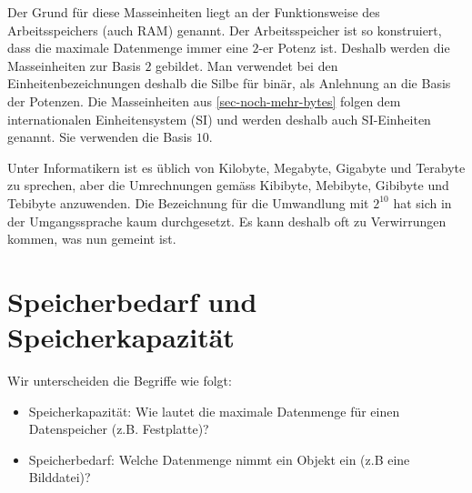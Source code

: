 Der Grund für diese Masseinheiten liegt an der Funktionsweise des Arbeitsspeichers (auch \ac{RAM}) genannt. Der Arbeitsspeicher ist so konstruiert, dass die maximale Datenmenge immer eine $2$-er Potenz ist. Deshalb werden die Masseinheiten zur Basis $2$ gebildet. Man verwendet bei den Einheitenbezeichnungen deshalb die Silbe  für binär, als Anlehnung an die Basis der Potenzen. Die Masseinheiten aus \autoref{sec-noch-mehr-bytes} folgen dem internationalen Einheitensystem (\ac{SI}) und werden deshalb auch \ac{SI}-Einheiten genannt. Sie verwenden die Basis $10$.

\begin{important}
Unter Informatikern ist es üblich von Kilobyte, Megabyte, Gigabyte und Terabyte zu sprechen, aber die Umrechnungen gemäss Kibibyte, Mebibyte, Gibibyte und Tebibyte anzuwenden. Die  Bezeichnung für die Umwandlung mit $2^{10}$ hat sich in der Umgangssprache kaum durchgesetzt. Es kann deshalb oft zu Verwirrungen kommen, was nun gemeint ist.
\end{important}

\section{Speicherbedarf und Speicherkapazität}

Wir unterscheiden die Begriffe wie folgt:

\begin{itemize}
\item Speicherkapazität: Wie lautet die maximale Datenmenge für einen Datenspeicher (z.B. Festplatte)?
\item Speicherbedarf: Welche Datenmenge nimmt ein Objekt ein (z.B eine Bilddatei)?
\end{itemize}

\newpage


